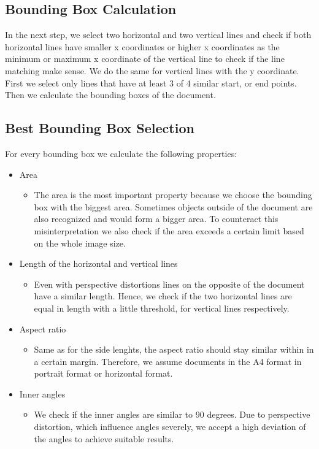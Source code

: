 \documentclass[english, paper=a4]{scrartcl}
\begin{document}
\subsection{Bounding Box Calculation}
In the next step, we select two horizontal and two vertical lines and check if both horizontal lines have smaller x coordinates or higher x coordinates as the minimum or maximum x coordinate of the vertical line to check if the line matching make sense. We do the same for vertical lines with the y coordinate. First we select only lines that have at least 3 of 4 similar start, or end points. Then we calculate the bounding boxes of the document.

\subsection{Best Bounding Box Selection}
For every bounding box we calculate the following properties:
\begin{itemize}
\item Area
\begin{itemize}
\item The area is the most important property because we choose the bounding box with the biggest area. Sometimes objects outside of the document are also recognized and would form a bigger area. To counteract this misinterpretation we also check if the area exceeds a certain limit based on the whole image size.
\end{itemize}
\item Length of the horizontal and vertical lines
\begin{itemize}
\item  Even with perspective distortions lines on the opposite of the document
have a similar length.
Hence, we check if the two horizontal lines are equal in length with a little threshold, for vertical lines respectively.
\end{itemize}
\item Aspect ratio
\begin{itemize}
\item Same as for the side lenghts, the aspect ratio should stay similar within in a
certain margin. Therefore, we assume documents in the A4 format in portrait format or horizontal format.
\end{itemize}
\item Inner angles
\begin{itemize}
\item We check if the inner angles are similar to 90 degrees. Due to perspective distortion, which influence angles severely, we accept a high deviation of the angles to achieve suitable results.
\end{itemize}
\end{itemize}
\end{document}
